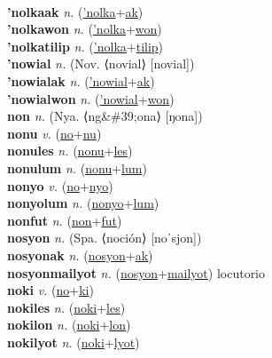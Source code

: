  \label{'nolka} \\
\textbf{'nolkaak} \textit{n.} (\hyperref['nolka]{'nolka}+\hyperref[ak]{ak})
 \label{'nolkaak} \\
\textbf{'nolkawon} \textit{n.} (\hyperref['nolka]{'nolka}+\hyperref[won]{won})
 \label{'nolkawon} \\
\textbf{'nolkatilip} \textit{n.} (\hyperref['nolka]{'nolka}+\hyperref[tilip]{tilip})
 \label{'nolkatilip} \\
\textbf{'nowial} \textit{n.} (Nov. ⟨novial⟩ [novial])
 \label{'nowial} \\
\textbf{'nowialak} \textit{n.} (\hyperref['nowial]{'nowial}+\hyperref[ak]{ak})
 \label{'nowialak} \\
\textbf{'nowialwon} \textit{n.} (\hyperref['nowial]{'nowial}+\hyperref[won]{won})
 \label{'nowialwon} \\
\textbf{non} \textit{n.} (Nya. ⟨ng\&\#39;ona⟩ [ŋona])
 \label{non} \\
\textbf{nonu} \textit{v.} (\hyperref[no]{no}+\hyperref[nu]{nu})
 \label{nonu} \\
\textbf{nonules} \textit{n.} (\hyperref[nonu]{nonu}+\hyperref[les]{les})
 \label{nonules} \\
\textbf{nonulum} \textit{n.} (\hyperref[nonu]{nonu}+\hyperref[lum]{lum})
 \label{nonulum} \\
\textbf{nonyo} \textit{v.} (\hyperref[no]{no}+\hyperref[nyo]{nyo})
 \label{nonyo} \\
\textbf{nonyolum} \textit{n.} (\hyperref[nonyo]{nonyo}+\hyperref[lum]{lum})
 \label{nonyolum} \\
\textbf{nonfut} \textit{n.} (\hyperref[non]{non}+\hyperref[fut]{fut})
 \label{nonfut} \\
\textbf{nosyon} \textit{n.} (Spa. ⟨noción⟩ [noˈsjon])
 \label{nosyon} \\
\textbf{nosyonak} \textit{n.} (\hyperref[nosyon]{nosyon}+\hyperref[ak]{ak})
 \label{nosyonak} \\
\textbf{nosyonmailyot} \textit{n.} (\hyperref[nosyon]{nosyon}+\hyperref[mailyot]{mailyot})
locutorio \label{nosyonmailyot} \\
\textbf{noki} \textit{v.} (\hyperref[no]{no}+\hyperref[ki]{ki})
 \label{noki} \\
\textbf{nokiles} \textit{n.} (\hyperref[noki]{noki}+\hyperref[les]{les})
 \label{nokiles} \\
\textbf{nokilon} \textit{n.} (\hyperref[noki]{noki}+\hyperref[lon]{lon})
 \label{nokilon} \\
\textbf{nokilyot} \textit{n.} (\hyperref[noki]{noki}+\hyperref[lyot]{lyot})
